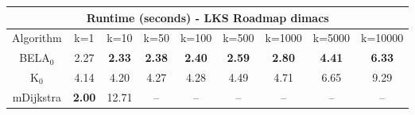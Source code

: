 \begin{tabular}{c|cccccccc}\toprule
\multicolumn{9}{c}{Runtime (seconds) - LKS Roadmap dimacs}\\ \midrule
Algorithm & k=1 & k=10 & k=50 & k=100 & k=500 & k=1000 & k=5000 & k=10000 \\ \midrule
BELA$_0$ & 2.27 & \textbf{2.33} & \textbf{2.38} & \textbf{2.40} & \textbf{2.59} & \textbf{2.80} & \textbf{4.41} & \textbf{6.33} \\
K$_0$ & 4.14 & 4.20 & 4.27 & 4.28 & 4.49 & 4.71 & 6.65 & 9.29 \\
mDijkstra & \textbf{2.00} & 12.71 & -- & -- & -- & -- & -- & -- \\ \bottomrule 
\end{tabular}
